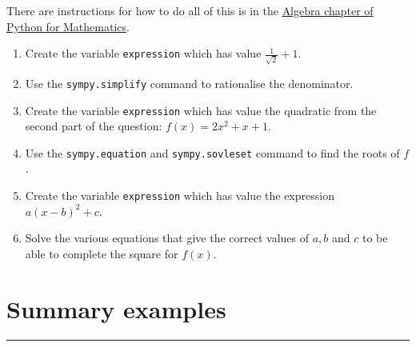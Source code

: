 \documentclass{article}
\begin{document}
There are instructions for how to do all of this is in the
\href{https://vknight.org/pfm/tools-for-mathematics/02-algebra/how/main.html}{Algebra chapter of Python for Mathematics}.


\begin{enumerate}
\item
  Create the variable \texttt{expression} which has value
        $\frac{1}{\sqrt{2}} + 1$.
\item Use the \texttt{sympy.simplify} command to rationalise the
        denominator.
\item Create the variable \texttt{expression} which has value the
        quadratic from the second part of the question: $f(x) = 2x^ 2 + x + 1$.
\item Use the \texttt{sympy.equation} and
        \texttt{sympy.sovleset} command to find the roots of $f$.
\item Create the variable \texttt{expression} which has value the
        expression $a(x-b) ^ 2 + c$.
\item Solve the various equations that give the correct values of $a, b$ and
    $c$ to be able to complete the square for $f(x)$.
\end{enumerate}


\section{Summary examples}
\hrule
\end{document}
